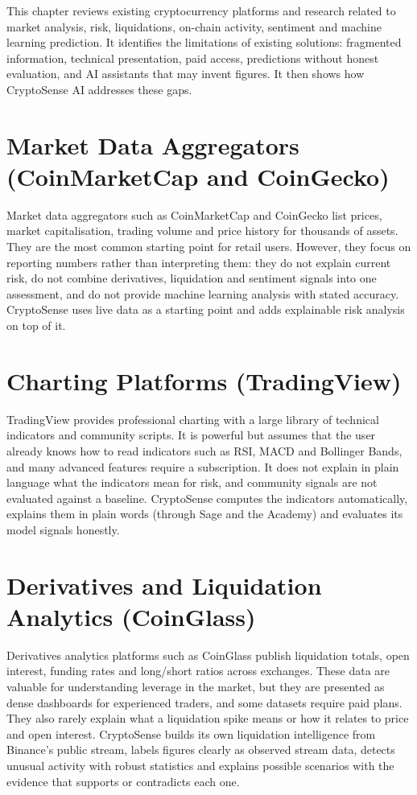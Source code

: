 
\chapteroverview
This chapter reviews existing cryptocurrency platforms and research related to market analysis, risk, liquidations, on-chain activity, sentiment and machine learning prediction. It identifies the limitations of existing solutions: fragmented information, technical presentation, paid access, predictions without honest evaluation, and AI assistants that may invent figures. It then shows how CryptoSense AI addresses these gaps.

\section{Market Data Aggregators (CoinMarketCap and CoinGecko)}
Market data aggregators such as CoinMarketCap and CoinGecko list prices, market capitalisation, trading volume and price history for thousands of assets. They are the most common starting point for retail users. However, they focus on reporting numbers rather than interpreting them: they do not explain current risk, do not combine derivatives, liquidation and sentiment signals into one assessment, and do not provide machine learning analysis with stated accuracy. CryptoSense uses live data as a starting point and adds explainable risk analysis on top of it.

\section{Charting Platforms (TradingView)}
TradingView provides professional charting with a large library of technical indicators and community scripts. It is powerful but assumes that the user already knows how to read indicators such as RSI, MACD and Bollinger Bands, and many advanced features require a subscription. It does not explain in plain language what the indicators mean for risk, and community signals are not evaluated against a baseline. CryptoSense computes the indicators automatically, explains them in plain words (through Sage and the Academy) and evaluates its model signals honestly.

\section{Derivatives and Liquidation Analytics (CoinGlass)}
Derivatives analytics platforms such as CoinGlass publish liquidation totals, open interest, funding rates and long/short ratios across exchanges. These data are valuable for understanding leverage in the market, but they are presented as dense dashboards for experienced traders, and some datasets require paid plans. They also rarely explain what a liquidation spike means or how it relates to price and open interest. CryptoSense builds its own liquidation intelligence from Binance's public stream, labels figures clearly as observed stream data, detects unusual activity with robust statistics and explains possible scenarios with the evidence that supports or contradicts each one.

